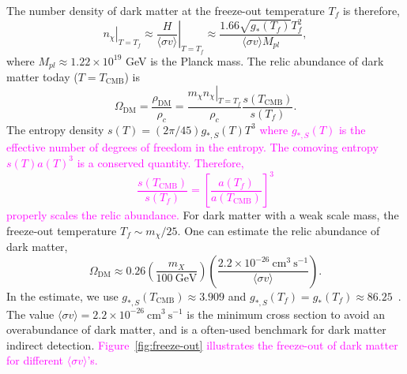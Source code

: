 \documentclass[doublespace,nopageskip]{VTthesis} %
\newcommand{\DS}[1]{\textcolor{magenta}{#1}}
\newcommand{\sigmav}{\langle\sigma v\rangle}
\begin{document}
The number density of dark matter at the freeze-out temperature $T_f$ is therefore,
\begin{equation}
    \left.n_\chi\right|_{T = T_f} \approx \left.\frac{H}{\langle\sigma v\rangle}\right|_{T = T_f} \approx \frac{1.66\sqrt{g_*(T_f)}T_f^2}{\langle\sigma v\rangle M_{pl}},
\end{equation}
where $M_{pl} \approx 1.22\times 10^{19}$ GeV is the Planck mass.
The relic abundance of dark matter today ($T=T_\mathrm{CMB}$) is
\begin{equation}
    \Omega_\mathrm{DM} = \frac{\rho_\mathrm{DM}}{\rho_c} = \frac{\left. m_\chi n_\chi\right|_{T = T_f}}{\rho_c}\frac{s(T_\mathrm{CMB})}{s(T_f)}.
\end{equation}
The entropy density
$s(T) = (2\pi/45)g_{*,S}(T)T^3$ \DS{where $g_{*,S}(T)$ is the effective number of degrees of freedom in the entropy. The comoving entropy $s(T)a(T)^3$ is a conserved quantity. Therefore,
\begin{equation}
    \frac{s(T_\mathrm{CMB})}{s(T_f)} = \left[\frac{a(T_f)}{a(T_\mathrm{CMB})}\right]^3
\end{equation}
properly scales the relic abundance.}
For dark matter with a weak scale mass, the freeze-out temperature $T_f \sim m_\chi/25$. One can estimate the relic abundance of dark matter,
\begin{equation}
    \Omega_\mathrm{DM} \approx 0.26 \left( \frac{m_X}{100\ \mathrm{GeV}} \right) \left( \frac{2.2\times 10^{-26}\ \mathrm{cm}^3\ \mathrm{s}^{-1}}{\langle\sigma v\rangle} \right).
\end{equation}
In the estimate, we use $g_{*,S}(T_\mathrm{CMB}) \approx 3.909$ and $g_{*,S}(T_f) = g_{*}(T_f) \approx 86.25$~\cite{2016Galax...4...78H}. The value $\langle\sigma v\rangle = 2.2\times 10^{-26}\ \mathrm{cm}^3\ \mathrm{s}^{-1}$ is the minimum cross section to avoid an overabundance of dark matter, and is a often-used benchmark for dark matter indirect detection. \DS{Figure~\ref{fig:freeze-out} illustrates the freeze-out of dark matter for different $\sigmav$'s.}
\end{document}
